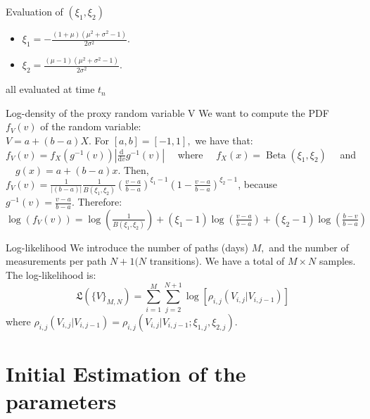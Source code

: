 \documentclass{beamer}
\begin{document}
\begin{frame}{Evaluation of $(\xi_{1},\xi_{2})$}
\begin{itemize}
\item $\xi_{1}=-\frac{(1+\mu)\left(\mu^{2}+\sigma^{2}-1\right)}{2 \sigma^{2}}$.
\item $\xi_{2}=\frac{(\mu-1)\left(\mu^{2}+\sigma^{2}-1\right)}{2 \sigma^{2}}$.
\end{itemize}
\vskip 0.5cm
 all evaluated at time $t_{n}$
\end{frame}

\begin{frame}{Log-density of the proxy random variable V}
\justifying
We want to compute the PDF $f_{V}(v)$ of the random variable:\\ $V=a+(b-a)X$. 
\vskip 0.5cm
 For $[a, b]=[-1,1],$ we have that: \\
$f_{V}(v)=f_{X}\left(g^{-1}(v)\right)\left|\frac{\mathrm{d}}{\mathrm{d} v} g^{-1}(v)\right| \quad$ where $\quad f_{X}(x)=\operatorname{Beta}\left(\xi_{1}, \xi_{2}\right) \quad$ and $\quad g(x)=a+(b-a) x$.
\vskip 0.5cm
Then, 
\\$f_{V}(v)=\frac{1}{|(b-a)|} \frac{1}{B\left(\xi_{1}, \xi_{2}\right)}\left(\frac{v-a}{b-a}\right)^{\xi_{1}-1}\left(1-\frac{v-a}{b-a}\right)^{\xi_{2}-1}$, because \\$g^{-1}(v)=\frac{v-a}{b-a}$.\vskip 0.5cm
Therefore:\\
$\log \left(f_{V}(v)\right)=\log \left(\frac{1}{B\left(\xi_{1}, \xi_{2}\right)}\right)+\left(\xi_{1}-1\right) \log \left(\frac{v-a}{b-a}\right)+\left(\xi_{2}-1\right) \log \left(\frac{b-v}{b-a}\right)$
\end{frame}
\begin{frame}{Log-likelihood}
\justifying
We introduce the number of paths (days) $M,$ and the number of measurements per path $N+1(N$ transitions). We have a total of $M \times N$ samples. 	The log-likelihood is:
\[
\mathfrak{L}\left(\{V\}_{M, N}\right)=\sum_{i=1}^{M} \sum_{j=2}^{N+1} \log \left[\rho_{i, j}\left(V_{i, j} | V_{i, j-1}\right)\right]
\]
where $\rho_{i, j}\left(V_{i, j} | V_{i, j-1}\right)=\rho_{i, j}\left(V_{i, j} | V_{i, j-1} ; \xi_{1, j}, \xi_{2, j}\right)$.
\end{frame}


\section{Initial Estimation of the parameters}
\end{document}
